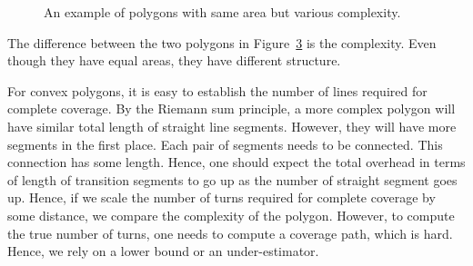 \documentclass[../main.tex]{subfiles}
\begin{document}
\begin{figure}
	\centering
	\begin{subfigure}{0.5\linewidth}
		\centering
		\caption{\label{fig:area_complexity_i}}
	\end{subfigure}%
	\begin{subfigure}{0.5\linewidth}
		\centering
		
		\caption{\label{fig:area_complexity_ii}}
	\end{subfigure}
	\caption{An example of polygons with same area but various complexity.}
	\label{fig:area_complexity}
\end{figure}

The difference between the two polygons in Figure~\ref{fig:area_complexity} is the complexity. Even though they have equal areas, they have different structure.

For convex polygons, it is easy to establish the number of lines required for complete coverage. By the Riemann sum principle, a more complex polygon will have similar total length of straight line segments. However, they will have more segments in the first place. Each pair of segments needs to be connected. This connection has some length. Hence, one should expect the total overhead in terms of length of transition segments to go up as the number of straight segment goes up. Hence, if we scale the number of turns required for complete coverage by some distance, we compare the complexity of the polygon. However, to compute the true number of turns, one needs to compute a coverage path, which is hard. Hence, we rely on a lower bound or an under-estimator.


\end{document}
